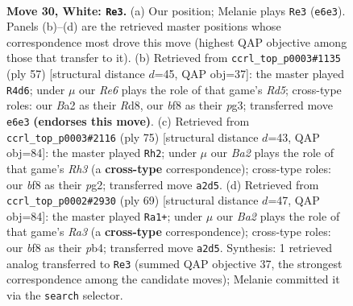 \documentclass[11pt]{article}
\begin{document}
\clearpage

\begin{figure}[p]\centering
\begin{subfigure}{0.46\textwidth}\centering
\resizebox{\linewidth}{!}{%
\newchessgame
\chessboard[
  setfen={5b2/pp5p/4R1pk/8/8/P5P1/BPq2P1P/6K1 w - - 5 30},
  showmover=false,
  pgfstyle=straightmove, color=movearrow, markmove={e6-e3}
]}
\caption{}
\end{subfigure}\hfill
\begin{subfigure}{0.46\textwidth}\centering
\resizebox{\linewidth}{!}{%
\newchessgame
\chessboard[
  setfen={3r4/8/1p2Q1pk/p6p/P2r4/6P1/1P3P1P/6K1 b - - 3 29},
  showmover=false,
  pgfstyle=straightmove, color=movearrow, markmove={d4-d6}
]}
\caption{}
\end{subfigure}
\\[4pt]
\begin{subfigure}{0.46\textwidth}\centering
\resizebox{\linewidth}{!}{%
\newchessgame
\chessboard[
  setfen={8/4Qpk1/p3p2r/P3P1p1/1P6/4PK2/1r4P1/8 b - - 6 38},
  showmover=false,
  pgfstyle=straightmove, color=movearrow, markmove={h6-h2}
]}
\caption{}
\end{subfigure}\hfill
\begin{subfigure}{0.46\textwidth}\centering
\resizebox{\linewidth}{!}{%
\newchessgame
\chessboard[
  setfen={8/6kp/r2pQ1p1/3Pp3/1P3pP1/7P/3r1P2/5K2 b - g3 0 35},
  showmover=false,
  pgfstyle=straightmove, color=movearrow, markmove={a6-a1}
]}
\caption{}
\end{subfigure}
\caption{\textbf{Move 30, White: \texttt{Re3}.} (a) Our position; Melanie plays \texttt{Re3} (\texttt{e6e3}). Panels (b)--(d) are the retrieved master positions whose correspondence most drove this move (highest QAP objective among those that transfer to it). (b) Retrieved from \texttt{ccrl\_top\_p0003\#1135} (ply 57) [structural distance $d$=45, QAP obj=37]: the master played \texttt{R4d6}; under $\mu$ our \emph{Re6} plays the role of that game's \emph{Rd5}; cross-type roles: our \emph{B}a2 as their \emph{R}d8, our \emph{b}f8 as their \emph{p}g3; transferred move \texttt{e6e3} \textbf{(endorses this move)}. (c) Retrieved from \texttt{ccrl\_top\_p0003\#2116} (ply 75) [structural distance $d$=43, QAP obj=84]: the master played \texttt{Rh2}; under $\mu$ our \emph{Ba2} plays the role of that game's \emph{Rh3} (a \textbf{cross-type} correspondence); cross-type roles: our \emph{b}f8 as their \emph{p}g2; transferred move \texttt{a2d5}. (d) Retrieved from \texttt{ccrl\_top\_p0002\#2930} (ply 69) [structural distance $d$=47, QAP obj=84]: the master played \texttt{Ra1+}; under $\mu$ our \emph{Ba2} plays the role of that game's \emph{Ra3} (a \textbf{cross-type} correspondence); cross-type roles: our \emph{b}f8 as their \emph{p}b4; transferred move \texttt{a2d5}. Synthesis: 1 retrieved analog transferred to \texttt{Re3} (summed QAP objective 37, the strongest correspondence among the candidate moves); Melanie committed it via the \texttt{search} selector.}
\label{fig:thought-m58}
\end{figure}
\end{document}
